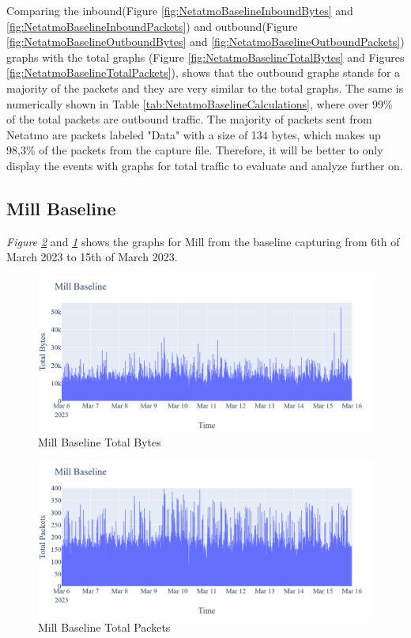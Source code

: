 Comparing the inbound(Figure \ref{fig:NetatmoBaselineInboundBytes} and \ref{fig:NetatmoBaselineInboundPackets}) and outbound(Figure \ref{fig:NetatmoBaselineOutboundBytes} and \ref{fig:NetatmoBaselineOutboundPackets}) graphs with the total graphs (Figure \ref{fig:NetatmoBaselineTotalBytes} and Figures \ref{fig:NetatmoBaselineTotalPackets}), shows that the outbound graphs stands for a majority of the packets and they are very similar to the total graphs. The same is numerically shown in Table \ref{tab:NetatmoBaselineCalculations}, where over 99\% of the total packets are outbound traffic. The majority of packets sent from Netatmo are packets labeled "Data" with a size of 134 bytes, which makes up 98,3\% of the packets from the capture file. Therefore, it will be better to only display the events with graphs for total traffic to evaluate and analyze further on. 

\subsection{Mill Baseline}
\textit{Figure \ref{fig:MillBaselineTotalPackets}} and \textit{\ref{fig:MillBaselineTotalBytes}} shows the graphs for Mill from the baseline capturing from 6th of March 2023 to 15th of March 2023. 
\begin{figure} [H]
    \centering
    \includegraphics[scale=0.3]{figures/Mill_Baseline_TotalBytes.png}
    \caption{Mill Baseline Total Bytes}
    \label{fig:MillBaselineTotalBytes}
\end{figure}

\begin{figure} [H]
    \centering
    \includegraphics[scale=0.3]{figures/Mill_Baseline_TotalPackets.png}
    \caption{Mill Baseline Total Packets}
    \label{fig:MillBaselineTotalPackets}
 \end{figure}

